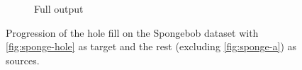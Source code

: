 \begin{figure}
\begin{subfigure}{0.2\linewidth}
\caption{Full output}
\label{fig:spongefull}
\end{subfigure}
\caption{Progression of the hole fill on the Spongebob dataset with \ref{fig:sponge-hole} as target and the rest (excluding \ref{fig:sponge-a}) as sources.}
\label{fig:spongefill}
\end{figure}

